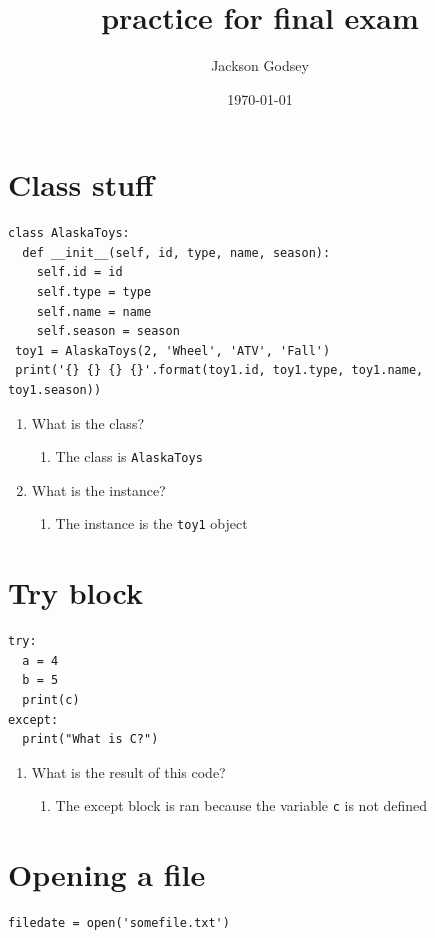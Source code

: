 \documentclass{article}
\author{Jackson Godsey}
\date{\today}
\title{practice for final exam}
\begin{document}
\maketitle

\section{Class stuff}
\label{sec:orga9665fa}
\begin{verbatim}
class AlaskaToys:
  def __init__(self, id, type, name, season):
    self.id = id
    self.type = type
    self.name = name
    self.season = season
 toy1 = AlaskaToys(2, 'Wheel', 'ATV', 'Fall')
 print('{} {} {} {}'.format(toy1.id, toy1.type, toy1.name, toy1.season))
\end{verbatim}
\begin{enumerate}
\item What is the class?
\label{sec:org5689c65}
\begin{enumerate}
\item The class is \texttt{AlaskaToys}
\label{sec:org2b6ac71}
\end{enumerate}
\item What is the instance?
\label{sec:org4f92d97}
\begin{enumerate}
\item The instance is the \texttt{toy1} object
\label{sec:org0011528}
\end{enumerate}
\end{enumerate}


\section{Try block}
\label{sec:org6f911bd}
\begin{verbatim}
try:
  a = 4
  b = 5
  print(c)
except:
  print("What is C?")
\end{verbatim}
\begin{enumerate}
\item What is the result  of this code?
\label{sec:org3eb83bf}
\begin{enumerate}
\item The except block is ran because the variable \texttt{c} is not defined
\label{sec:org5029546}
\end{enumerate}
\end{enumerate}


\section{Opening a file}
\label{sec:org0a2f0c6}
\begin{verbatim}
filedate = open('somefile.txt')
\end{verbatim}
\end{document}
